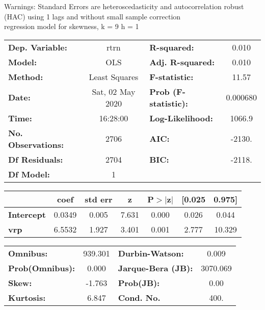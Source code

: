 Warnings: \newline
 [1] Standard Errors are heteroscedasticity and autocorrelation robust (HAC) using 1 lags and without small sample correction\\ 

regression model for skewness, k = 9 h = 1\begin{center}
\begin{tabular}{lclc}
\toprule
\textbf{Dep. Variable:}    &       rtrn       & \textbf{  R-squared:         } &     0.010   \\
\textbf{Model:}            &       OLS        & \textbf{  Adj. R-squared:    } &     0.010   \\
\textbf{Method:}           &  Least Squares   & \textbf{  F-statistic:       } &     11.57   \\
\textbf{Date:}             & Sat, 02 May 2020 & \textbf{  Prob (F-statistic):} &  0.000680   \\
\textbf{Time:}             &     16:28:00     & \textbf{  Log-Likelihood:    } &    1066.9   \\
\textbf{No. Observations:} &        2706      & \textbf{  AIC:               } &    -2130.   \\
\textbf{Df Residuals:}     &        2704      & \textbf{  BIC:               } &    -2118.   \\
\textbf{Df Model:}         &           1      & \textbf{                     } &             \\
\bottomrule
\end{tabular}
\begin{tabular}{lcccccc}
                   & \textbf{coef} & \textbf{std err} & \textbf{z} & \textbf{P$> |$z$|$} & \textbf{[0.025} & \textbf{0.975]}  \\
\midrule
\textbf{Intercept} &       0.0349  &        0.005     &     7.631  &         0.000        &        0.026    &        0.044     \\
\textbf{vrp}       &       6.5532  &        1.927     &     3.401  &         0.001        &        2.777    &       10.329     \\
\bottomrule
\end{tabular}
\begin{tabular}{lclc}
\textbf{Omnibus:}       & 939.301 & \textbf{  Durbin-Watson:     } &    0.009  \\
\textbf{Prob(Omnibus):} &   0.000 & \textbf{  Jarque-Bera (JB):  } & 3070.069  \\
\textbf{Skew:}          &  -1.763 & \textbf{  Prob(JB):          } &     0.00  \\
\textbf{Kurtosis:}      &   6.847 & \textbf{  Cond. No.          } &     400.  \\
\bottomrule
\end{tabular}
\end{center}


